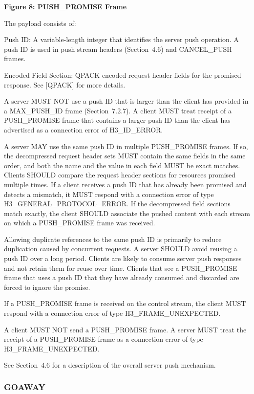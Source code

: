\documentclass{article}
\begin{document}
\begin{center}
\textbf{Figure 8: PUSH\_PROMISE Frame}
\end{center}

The payload consists of:

Push ID:  A variable-length integer that identifies the server push operation.  A push ID is used in push stream headers (Section~4.6) and CANCEL\_PUSH frames.

Encoded Field Section:  QPACK-encoded request header fields for the promised response.  See [QPACK] for more details.

A server MUST NOT use a push ID that is larger than the client has provided in a MAX\_PUSH\_ID frame (Section~7.2.7).  A client MUST treat receipt of a PUSH\_PROMISE frame that contains a larger push ID than the client has advertised as a connection error of H3\_ID\_ERROR.

A server MAY use the same push ID in multiple PUSH\_PROMISE frames. If so, the decompressed request header sets MUST contain the same fields in the same order, and both the name and the value in each field MUST be exact matches.  Clients SHOULD compare the request header sections for resources promised multiple times.  If a client receives a push ID that has already been promised and detects a mismatch, it MUST respond with a connection error of type H3\_GENERAL\_PROTOCOL\_ERROR.  If the decompressed field sections match exactly, the client SHOULD associate the pushed content with each stream on which a PUSH\_PROMISE frame was received.

Allowing duplicate references to the same push ID is primarily to reduce duplication caused by concurrent requests.  A server SHOULD avoid reusing a push ID over a long period.  Clients are likely to consume server push responses and not retain them for reuse over time.  Clients that see a PUSH\_PROMISE frame that uses a push ID that they have already consumed and discarded are forced to ignore the promise.

If a PUSH\_PROMISE frame is received on the control stream, the client MUST respond with a connection error of type H3\_FRAME\_UNEXPECTED.

A client MUST NOT send a PUSH\_PROMISE frame.  A server MUST treat the receipt of a PUSH\_PROMISE frame as a connection error of type H3\_FRAME\_UNEXPECTED.

See Section~4.6 for a description of the overall server push mechanism.

\subsubsection{GOAWAY}
\end{document}
